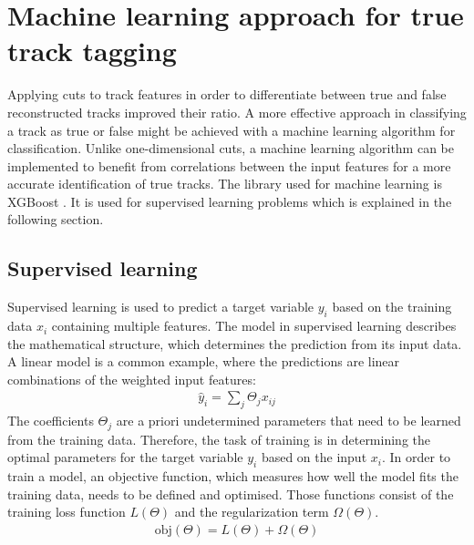 \chapter{Machine learning approach for true track tagging}
Applying cuts to track features in order to differentiate between true and false reconstructed tracks improved their ratio. A more effective
approach in classifying a track as true or false might be achieved with a machine learning algorithm for classification. Unlike one-dimensional cuts, a machine learning
algorithm can be implemented to benefit from correlations between the input features for a more accurate identification of true tracks. The library used for
machine learning is XGBoost \cite{xgboost}. It is used for supervised learning problems \cite{supervised} which is explained in the following section.

\section{Supervised learning}
Supervised learning is used to predict a target variable $y_i$ based on the training data $x_i$ containing multiple features. The model
in supervised learning describes the mathematical structure, which determines the prediction from its input data. A linear model is a common example, where the predictions
are linear combinations of the weighted input features:
\begin{align}
  \hat{y}_i = \sum_j \Theta_j x_{ij}
\end{align}
The coefficients $\Theta_j$ are a priori undetermined parameters that need to be learned from the training data.
Therefore, the task of training is in determining the optimal parameters
for the target variable $y_i$ based on the input $x_i$. In order to train a model, an objective function, which measures how well
the model fits the training data, needs to be defined and optimised.
Those functions consist of the training loss function $L(\Theta) $ and the regularization term $\Omega (\Theta)$.
\begin{align}
  \text{obj}(\Theta) = L(\Theta) + \Omega(\Theta)
\end{align}

